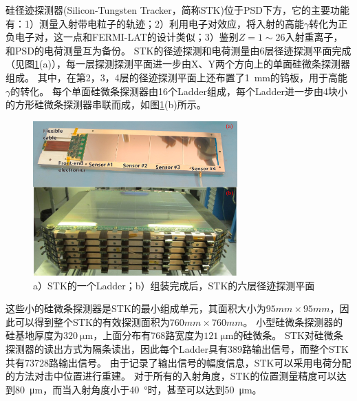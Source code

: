 硅径迹探测器(Silicon-Tungsten Tracker，简称STK)位于PSD下方\parencite{stk_dampe}，它的主要功能有：1）测量入射带电粒子的轨迹；2）利用电子对效应，将入射的高能$\gamma$转化为正负电子对，这一点和FERMI-LAT的设计类似；3）鉴别$Z=1\sim 26$入射重离子，和PSD的电荷测量互为备份。
STK的径迹探测和电荷测量由6层径迹探测平面完成（见图\ref{fig:introduction:stk_combined}(a)），每一层探测探测平面进一步由X、Y两个方向上的单面硅微条探测器组成。
其中，在第2，3，4层的径迹探测平面上还布置了\SI{1}{mm}的钨板，用于高能$\gamma$的转化。
每个单面硅微条探测器由16个Ladder组成，每个Ladder进一步由4块小的方形硅微条探测器串联而成，如图\ref{fig:introduction:stk_combined}(b)所示。
\begin{figure}[htbp]
	\centering
	\includegraphics[width=0.7\textwidth]{chap/introduction/fig/stk_combined.jpg}
	\caption{a）STK的一个Ladder；b）组装完成后，STK的六层径迹探测平面}
	\label{fig:introduction:stk_combined}
\end{figure}
这些小的硅微条探测器是STK的最小组成单元，其面积大小为$95mm\times 95mm$，因此可以得到整个STK的有效探测面积为$760mm \times 760mm$。
小型硅微条探测器的硅基地厚度为$\SI{320}{\micro\meter}$，上面分布有768路宽度为$\SI{121}{\micro\meter}$的硅微条。
STK对硅微条探测器的读出方式为隔条读出，因此每个Ladder具有389路输出信号，而整个STK共有73728路输出信号。
由于记录了输出信号的幅度信息，STK可以采用电荷分配的方法对击中位置进行重建。
对于所有的入射角度，STK的位置测量精度可以达到\SI{80}{\micro\meter}，而当入射角度小于\SI{40}{\degree}时，甚至可以达到\SI{50}{\micro\meter}。

